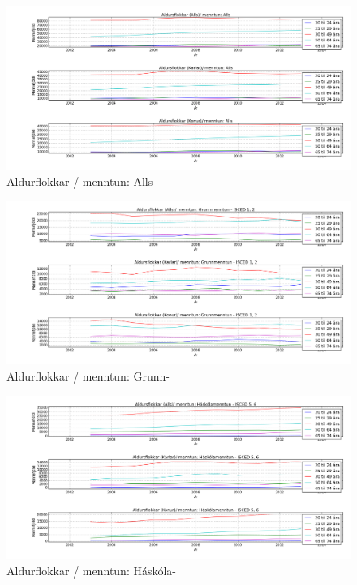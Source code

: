 \documentclass[12pt, svn, draft]{rureport}
\begin{document}
\begin{figure}
	\centering 
	\includegraphics[width=\textwidth]{../graphics/mentun_aldrusflokkar_alls.png}
	\caption{Aldurflokkar / menntun: Alls \label{fig:menntunall}}
\end{figure}

\begin{figure}
	\centering 
	\includegraphics[width=\textwidth]{../graphics/mentun_aldrusflokkar_grunnmenntun.png}
	\caption{Aldurflokkar / menntun: Grunn- \label{fig:menntungrunn}}
\end{figure}

\begin{figure}
	\centering 
	\includegraphics[width=\textwidth]{../graphics/mentun_aldrusflokkar_haskolamenntun.png}
	\caption{Aldurflokkar / menntun: Háskóla- \label{fig:menntunhs}}
\end{figure}
\end{document}
